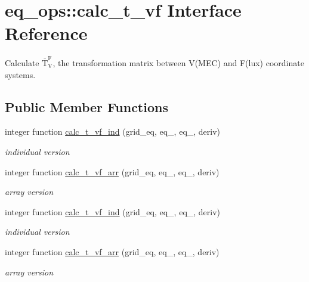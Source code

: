 \hypertarget{interfaceeq__ops_1_1calc__t__vf}{}\section{eq\+\_\+ops\+:\+:calc\+\_\+t\+\_\+vf Interface Reference}
\label{interfaceeq__ops_1_1calc__t__vf}


Calculate $\overline{\text{T}}_\text{V}^\text{F}$, the transformation matrix between V(\+M\+E\+C) and F(lux) coordinate systems.  


\subsection*{Public Member Functions}
\begin{DoxyCompactItemize}
\item 
integer function \hyperlink{interfaceeq__ops_1_1calc__t__vf_a03e04d9c0e2c6f839c578a092bbe47ee}{calc\+\_\+t\+\_\+vf\+\_\+ind} (grid\+\_\+eq, eq\+\_, eq\+\_, deriv)
\begin{DoxyCompactList}\small\item\em individual version \end{DoxyCompactList}\item 
integer function \hyperlink{interfaceeq__ops_1_1calc__t__vf_a011486ab4c748213628917b7fb40d924}{calc\+\_\+t\+\_\+vf\+\_\+arr} (grid\+\_\+eq, eq\+\_, eq\+\_, deriv)
\begin{DoxyCompactList}\small\item\em array version \end{DoxyCompactList}\item 
integer function \hyperlink{interfaceeq__ops_1_1calc__t__vf_a03e04d9c0e2c6f839c578a092bbe47ee}{calc\+\_\+t\+\_\+vf\+\_\+ind} (grid\+\_\+eq, eq\+\_, eq\+\_, deriv)
\begin{DoxyCompactList}\small\item\em individual version \end{DoxyCompactList}\item 
integer function \hyperlink{interfaceeq__ops_1_1calc__t__vf_a011486ab4c748213628917b7fb40d924}{calc\+\_\+t\+\_\+vf\+\_\+arr} (grid\+\_\+eq, eq\+\_, eq\+\_, deriv)
\begin{DoxyCompactList}\small\item\em array version \end{DoxyCompactList}\end{DoxyCompactItemize}


